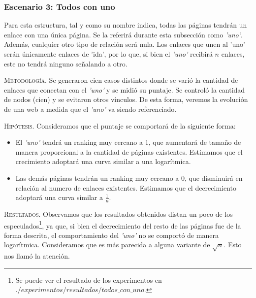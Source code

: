 \vspace{2em}
\subsubsection{Escenario 3: Todos con uno} Para esta estructura, tal y como su nombre indica, todas las páginas tendrán un enlace con una única página. Se la referirá durante esta subsección como \textit{'uno'}. Además, cualquier otro tipo de relación será nula. Los enlaces que unen al 'uno' serán únicamente enlaces de 'ida', por lo que, si bien el \textit{'uno'} recibirá $n$ enlaces, este no tendrá ninguno señalando a otro.

\vspace{1em}

\vspace{1em}
\noindent \textsc{Metodología}. Se generaron cien casos distintos donde se varió la cantidad de enlaces que conectan con el \textit{'uno'} y se midió su puntaje. Se controló la cantidad de nodos (cien) y se evitaron otros vínculos. De esta forma, veremos la evolución de una web a medida que el \textit{'uno'} va siendo referenciado.

\vspace{1em}
\noindent \textsc{Hipótesis}. Consideramos que el puntaje se comportará de la siguiente forma:
\begin{itemize}
\item El \textit{'uno'} tendrá un ranking muy cercano a 1, que aumentará de tamaño de manera proporcional a la cantidad de páginas existentes. Estimamos que el crecimiento adoptará una curva similar a una logarítmica.
\item Las demás páginas tendrán un ranking muy cercano a 0, que disminuirá en relación al numero de enlaces existentes. Estimamos que el decrecimiento adoptará una curva similar a $\frac{1}{n}$.
\end{itemize}

\vspace{1em}
\noindent \textsc{Resultados}. Observamos que los resultados obtenidos distan un poco de los especulados\footnote{Se puede ver el resultado de los experimentos en $./experimentos/resultados/todos\_con\_uno$.}, ya que, si bien el decrecimiento del resto de las páginas fue de la forma descrita, el comportamiento del \textit{'uno'} no se comportó de manera logarítmica. Consideramos que es más parecida a alguna variante de $\sqrt{n}$. Esto nos llamó la atención.



